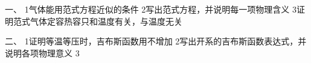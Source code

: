 

一、
{1}气体能用范式方程近似的条件
{2}写出范式方程，并说明每一项物理含义
{3}证明范式气体定容热容只和温度有关，与温度无关

二、
{1}证明等温等压时，吉布斯函数用不增加
{2}写出开系的吉布斯函数表达式，并说明各项物理意义
{3}